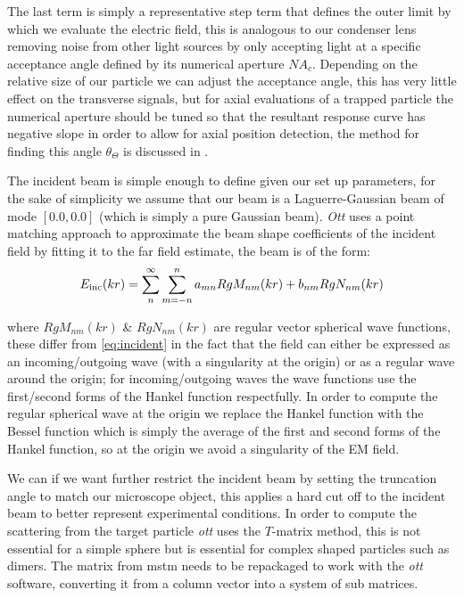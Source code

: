 The last term is simply a representative step term that defines the outer 
limit by which we evaluate the electric field, this is analogous to our 
condenser lens removing noise from other light sources by only accepting 
light at a specific acceptance angle defined by its numerical aperture 
$NA_c$. Depending on the relative size of our particle we can adjust 
the acceptance angle, this has very little effect on the transverse 
signals, but for axial evaluations of a trapped particle the numerical 
aperture should be tuned so that the resultant response curve has negative 
slope in order to allow for axial position detection, the method for 
finding this angle $\theta_\Theta$ is discussed in \cite{Friedrich2012}.

The incident beam is simple enough to define given our set up parameters, 
for the sake of simplicity we assume that our beam is a Laguerre-Gaussian 
beam of mode $[0.0, 0.0]$ (which is simply a pure Gaussian beam). 
\textit{Ott} uses a point matching approach to approximate the beam shape 
coefficients of the incident field by fitting it to the far field estimate, 
the beam is of the form:
\begin{align}
	E_{\rm inc}(kr)=\sum^\infty_n\sum^n_{m=-n}a_{mn}RgM_{nm}(kr)+b_{nm}RgN_{nm}(kr)
\end{align}

where $RgM_{nm}(kr)$ \& $RgN_{nm}(kr)$ are regular vector spherical wave 
functions, these differ from \eqref{eq:incident} in the fact that the 
field can either be expressed as an incoming/outgoing wave (with a 
singularity at the origin) or as a regular wave around the origin; for 
incoming/outgoing waves the wave functions use the first/second forms of 
the Hankel function respectfully. In order to compute the regular spherical 
wave at the origin we replace the Hankel function with the Bessel function 
which is simply the average of the first and second forms of the Hankel 
function, so at the origin we avoid a singularity of the EM field.  

We can if we want further restrict the incident beam by setting 
the truncation angle to match our microscope object, this applies a 
hard cut off to the incident beam to better represent experimental 
conditions. In order to compute the scattering from 
the target particle \textit{ott} uses the $T$-matrix method, this is not 
essential for a simple sphere but is essential for complex shaped particles 
such as dimers. The matrix from mstm needs to be repackaged to work with the
\textit{ott} software, converting it from a column vector into a system of 
sub matrices. 

